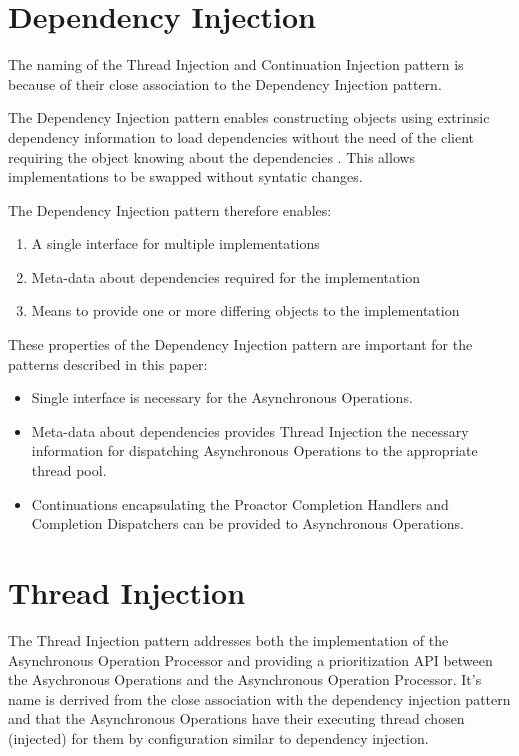 \documentclass{article}
\begin{document}
\section{Dependency Injection}

The naming of the Thread Injection and Continuation Injection pattern is because
of their close association to the Dependency Injection pattern.

The Dependency Injection pattern enables constructing objects using extrinsic
dependency information to load dependencies without the need of the client
requiring the object knowing about the dependencies \cite{ioc}.  This allows
implementations to be swapped without syntatic changes.

The Dependency Injection pattern therefore enables:
\begin{enumerate}
  \item A single interface for multiple implementations
  \item Meta-data about dependencies required for the implementation
  \item Means to provide one or more differing objects to the implementation
\end{enumerate}

These properties of the Dependency Injection pattern are important for the
patterns described in this paper:
\begin{itemize}
  \item Single interface is necessary for the Asynchronous Operations.
  \item Meta-data about dependencies provides Thread Injection the necessary information for dispatching Asynchronous Operations to the appropriate thread pool.
  \item Continuations encapsulating the Proactor Completion Handlers and Completion Dispatchers can be provided to Asynchronous Operations.
\end{itemize}

\section{Thread Injection}

The Thread Injection pattern addresses both the implementation of the
Asynchronous Operation Processor and providing a prioritization API between the
Asychronous Operations and the Asynchronous Operation Processor.  It's name is
derrived from the close association with the dependency injection pattern
\cite{ioc} and that the Asynchronous Operations have their executing thread
chosen (injected) for them by configuration similar to dependency injection.
\end{document}
